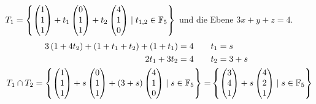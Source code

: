 $T_1 = 
\left\{
\begin{pmatrix}
    1\\ 1\\ 1
\end{pmatrix}
+ t_1
\begin{pmatrix}
    0\\ 1\\ 1
\end{pmatrix}
+ t_2
\begin{pmatrix}
    4\\ 1\\ 0
\end{pmatrix}
\mid t_{1,2} \in \mathbb{F}_5
\right\}$ und die Ebene $3 x + y + z = 4$.
\begin{align*}
    3\left( 1 + 4 t_2 \right) + \left( 1 + t_1 + t_2 \right) + \left( 1 + t_1 \right) = 4 \qquad & t_1 = s\\
    2 t_1 + 3 t_2 = 4 \qquad & t_2 = 3 + s\\
    T_1 \cap T_2 =
    \left\{
    \begin{pmatrix}
        1\\ 1\\ 1
    \end{pmatrix}
    + s
    \begin{pmatrix}
        0\\ 1\\ 1
    \end{pmatrix}
    + (3 + s)
    \begin{pmatrix}
        4\\ 1 \\0
    \end{pmatrix}
    \mid
    s \in \mathbb{F}_5
    \right\}
    = & 
    \left\{
    \begin{pmatrix}
        3\\ 4\\1
    \end{pmatrix}
    + s
    \begin{pmatrix}
        4\\ 2\\ 1
    \end{pmatrix}
    \mid s \in \mathbb{F}_5
    \right\}
\end{align*}

